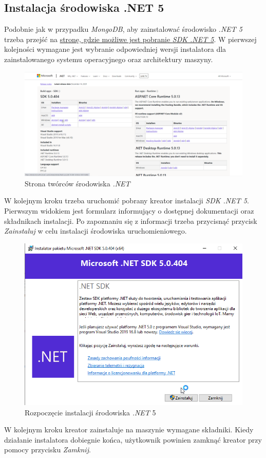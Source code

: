 \documentclass[a4paper,twoside,12pt]{book}
\begin{document}
\subsection{Instalacja środowiska .NET 5}
Podobnie jak w przypadku \textit{MongoDB}, aby zainstalować środowisko \textit{.NET 5} trzeba przejść na \href{https://dotnet.microsoft.com/en-us/download/dotnet/5.0}{stronę, gdzie możliwe jest pobranie \textit{SDK .NET 5}}. W pierwszej kolejności wymagane jest wybranie odpowiedniej wersji instalatora dla zainstalowanego systemu operacyjnego oraz architektury maszyny.
\begin{figure}[H]
	\centering
	\includegraphics[width=0.75\linewidth]{../zrzuty_ekranu/instalacja_dotnet5/dotnet_sdk}
	\caption{Strona twórców środowiska \textit{.NET}}
	\label{fig:dotnetsdk}
\end{figure}

W kolejnym kroku trzeba uruchomić pobrany kreator instalacji \textit{SDK .NET 5}. Pierwszym widokiem jest formularz informujący o dostępnej dokumentacji oraz składnikach instalacji. Po zapoznaniu się z informacji trzeba przycisnąć przycisk \textit{Zainstaluj} w celu instalacji środowiska uruchomieniowego.
\begin{figure}[H]
	\centering
	\includegraphics[width=0.5\linewidth]{../zrzuty_ekranu/instalacja_dotnet5/dotnet1}
	\caption{Rozpoczęcie instalacji środowiska \textit{.NET }5}
	\label{fig:dotnet1}
\end{figure}

W kolejnym kroku kreator zainstaluje na maszynie wymagane składniki. Kiedy działanie instalatora dobiegnie końca, użytkownik powinien zamknąć kreator przy pomocy przycisku \textit{Zamknij}.
\end{document}
